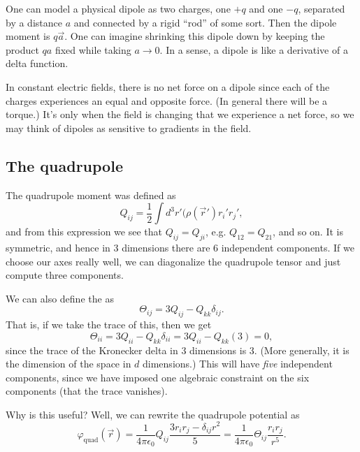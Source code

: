 One can model a physical dipole as two charges, one $+q$ and one $-q$, separated by a distance $a$ and connected by a rigid ``rod'' of some sort. Then the dipole moment is $q\vec a$. One can imagine shrinking this dipole down by keeping the product $qa$ fixed while taking $a\to 0$. In a sense, a dipole is like a derivative of a delta function.

In constant electric fields, there is no net force on a dipole since each of the charges experiences an equal and opposite force. (In general there will be a torque.) It's only when the field is changing that we experience a net force, so we may think of dipoles as sensitive to gradients in the field.

\subsection*{The quadrupole}
The quadrupole moment was defined as
\begin{equation}
    Q_{ij} = \frac{1}{2} \int d^3 r'(\rho (\vec r') r_i' r_j',
\end{equation}
and from this expression we see that $Q_{ij} = Q_{ji}$, e.g. $Q_{12}=Q_{21}$, and so on. It is symmetric, and hence in 3 dimensions there are 6 independent components. If we choose our axes really well, we can diagonalize the quadrupole tensor and just compute three components.

We can also define the  as
\begin{equation}
    \Theta_{ij} = 3 Q_{ij} - Q_{kk} \delta_{ij}.
\end{equation}
That is, if we take the trace of this, then we get
\begin{equation}
    \Theta_{ii} = 3Q_{ii} - Q_{kk} \delta_{ii} = 3Q_{ii} - Q_{kk}(3) = 0,
\end{equation}
since the trace of the Kronecker delta in 3 dimensions is 3. (More generally, it is the dimension of the space in $d$ dimensions.) This will have \emph{five} independent components, since we have imposed one algebraic constraint on the six components (that the trace vanishes).

Why is this useful? Well, we can rewrite the quadrupole potential as
\begin{equation}
    \varphi_\text{quad}(\vec r) = \frac{1}{4\pi \epsilon_0} Q_{ij} \frac{3r_i r_j - \delta_{ij} r^2}{5} = \frac{1}{4\pi \epsilon_0} \Theta_{ij} \frac{r_i r_j}{r^5}.
\end{equation}

